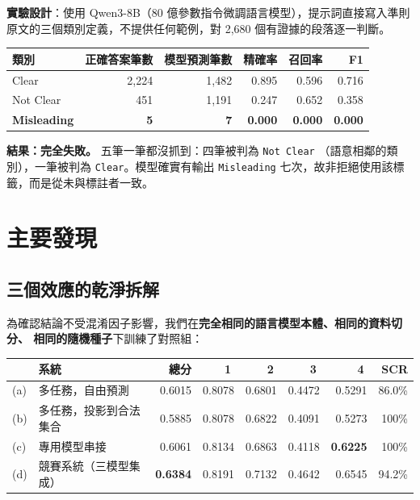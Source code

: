 \documentclass[11pt,a4paper]{ctexart}
\newcommand{\fieldname}[1]{\texttt{#1}}
\begin{document}
\textbf{實驗設計}：使用 Qwen3-8B（80 億參數指令微調語言模型），提示詞直接寫入準則
原文的三個類別定義，不提供任何範例，對 2{,}680 個有證據的段落逐一判斷。

\begin{table}[h]
\centering
\small
\begin{tabular}{@{}lrrrrr@{}}
\toprule
類別 & 正確答案筆數 & 模型預測筆數 & 精確率 & 召回率 & F1 \\
\midrule
Clear      & 2{,}224 & 1{,}482 & 0.895 & 0.596 & 0.716 \\
Not Clear  & 451     & 1{,}191 & 0.247 & 0.652 & 0.358 \\
\rowcolor{red!10}
\textbf{Misleading} & \textbf{5} & \textbf{7} & \textbf{0.000} & \textbf{0.000} & \textbf{0.000} \\
\bottomrule
\end{tabular}
\end{table}

\textbf{結果：完全失敗。} 五筆一筆都沒抓到：四筆被判為 \fieldname{Not Clear}
（語意相鄰的類別），一筆被判為 \fieldname{Clear}。模型確實有輸出
\fieldname{Misleading} 七次，故非拒絕使用該標籤，而是從未與標註者一致。

\section{主要發現}

\subsection{三個效應的乾淨拆解}
\label{sec:decomposition}

為確認結論不受混淆因子影響，我們在\textbf{完全相同的語言模型本體、相同的資料切分、
相同的隨機種子}下訓練了對照組：

\begin{table}[h]
\centering
\small
\begin{tabular}{@{}llrrrrrr@{}}
\toprule
 & 系統 & 總分 & \textcircled{1} & \textcircled{2} & \textcircled{3} & \textcircled{4} & SCR \\
\midrule
(a) & 多任務，自由預測         & 0.6015 & 0.8078 & 0.6801 & 0.4472 & 0.5291 & 86.0\% \\
(b) & 多任務，投影到合法集合   & 0.5885 & 0.8078 & 0.6822 & 0.4091 & 0.5273 & 100\% \\
(c) & 專用模型串接             & 0.6061 & 0.8134 & 0.6863 & 0.4118 & \textbf{0.6225} & 100\% \\
(d) & 競賽系統（三模型集成）   & \textbf{0.6384} & 0.8191 & 0.7132 & 0.4642 & 0.6545 & 94.2\% \\
\bottomrule
\end{tabular}
\end{table}
\end{document}
